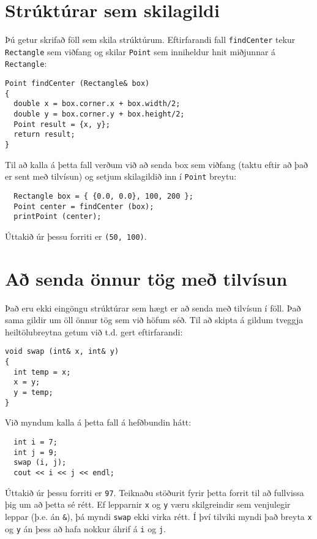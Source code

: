 
\section{Strúktúrar sem skilagildi}

Þú getur skrifað föll sem skila strúktúrum.
Eftirfarandi fall {\tt findCenter} tekur {\tt Rectangle} sem viðfang og skilar {\tt Point} sem inniheldur hnit miðjunnar á {\tt Rectangle}:

\begin{verbatim}
Point findCenter (Rectangle& box)
{
  double x = box.corner.x + box.width/2;
  double y = box.corner.y + box.height/2;
  Point result = {x, y};
  return result;
}
\end{verbatim}
%
Til að kalla á þetta fall verðum við að senda box sem viðfang (taktu eftir að það er sent með tilvísun) og setjum skilagildið inn í {\tt Point} breytu:

\begin{verbatim}
  Rectangle box = { {0.0, 0.0}, 100, 200 };
  Point center = findCenter (box);
  printPoint (center);
\end{verbatim}
%
Úttakið úr þessu forriti er {\tt (50, 100)}.

\section {Að senda önnur tög með tilvísun}

Það eru ekki eingöngu strúktúrar sem hægt er að senda með tilvísun í föll.
Það sama gildir um öll önnur tög sem við höfum séð.
Til að skipta á gildum tveggja heiltölubreytna getum við t.d. gert eftirfarandi: 

\begin{verbatim}
void swap (int& x, int& y)
{
  int temp = x;
  x = y;
  y = temp;
}
\end{verbatim}
%
Við myndum kalla á þetta fall á hefðbundin hátt:

\begin{verbatim}
  int i = 7;
  int j = 9;
  swap (i, j);
  cout << i << j << endl;
\end{verbatim}
%
Úttakið úr þessu forriti er {\tt 97}.
Teiknaðu stöðurit fyrir þetta forrit til að fullvissa þig um að þetta sé rétt.
Ef lepparnir {\tt x} og {\tt y} væru skilgreindir sem venjulegir leppar (þ.e. án {\tt \&}), þá myndi {\tt swap} ekki virka rétt.
Í því tilviki myndi það breyta {\tt x} og {\tt y} án þess að hafa nokkur áhrif á {\tt i} og {\tt j}.

